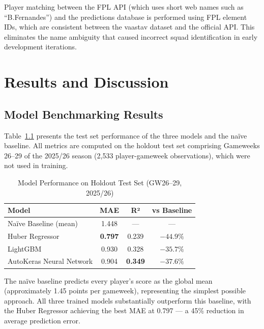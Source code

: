 \documentclass[11pt,english,listoffigures,listoftables]{tfgetsinf}
\begin{document}
Player matching between the FPL API (which uses short web names such as ``B.Fernandes'') and the predictions database is performed using FPL element IDs, which are consistent between the vaastav dataset and the official API. This eliminates the name ambiguity that caused incorrect squad identification in early development iterations.


\chapter{Results and Discussion}
\label{chap:results}

\section{Model Benchmarking Results}

Table~\ref{tab:results} presents the test set performance of the three models and the naïve baseline. All metrics are computed on the holdout test set comprising Gameweeks 26--29 of the 2025/26 season (2,533 player-gameweek observations), which were not used in training.

\begin{table}[h]
\centering
\caption{Model Performance on Holdout Test Set (GW26--29, 2025/26)}
\label{tab:results}
\begin{tabular}{lccc}
\toprule
\textbf{Model} & \textbf{MAE} & \textbf{R²} & \textbf{vs Baseline} \\
\midrule
Naïve Baseline (mean) & 1.448 & --- & --- \\
Huber Regressor & \textbf{0.797} & 0.239 & $-44.9\%$ \\
LightGBM & 0.930 & 0.328 & $-35.7\%$ \\
AutoKeras Neural Network & 0.904 & \textbf{0.349} & $-37.6\%$ \\
\bottomrule
\end{tabular}
\end{table}

The naïve baseline predicts every player's score as the global mean (approximately 1.45 points per gameweek), representing the simplest possible approach. All three trained models substantially outperform this baseline, with the Huber Regressor achieving the best MAE at 0.797 --- a 45\% reduction in average prediction error.
\end{document}

